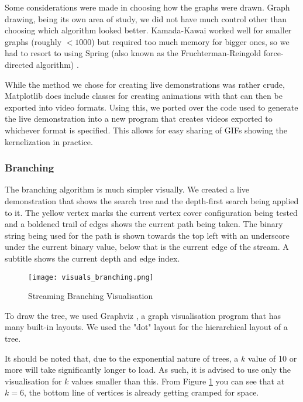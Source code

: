 Some considerations were made in choosing how the graphs were drawn. Graph
drawing, being its own area of study, we did not have much control other than
choosing which algorithm looked better. Kamada-Kawai \cite{kamada1989drawing}
worked well for smaller graphs (roughly $< 1000$) but required too much memory
for bigger ones, so we had to resort to using Spring (also known as the
Fruchterman-Reingold force-directed algorithm) \cite{fruchterman1991graph}.

While the method we chose for creating live demonstrations was rather crude,
Matplotlib does include classes for creating animations with that can then be
exported into video formats. Using this, we ported over the code used to
generate the live demonstration into a new program that creates videos exported
to whichever format is specified. This allows for easy sharing of GIFs showing
the kernelization in practice.

\subsubsection{Branching}

The branching algorithm is much simpler visually. We created a live
demonstration that shows the search tree and the depth-first search being
applied to it. The yellow vertex marks the current vertex cover configuration
being tested and a boldened trail of edges shows the current path being taken.
The binary string being used for the path is shown towards the top left with an
underscore under the current binary value, below that is the current edge of
the stream. A subtitle shows the current depth and edge index.

\begin{figure}[htb]
    \centering
    \texttt{[image: visuals\_branching.png]}
    \caption{Streaming Branching Visualisation}
    \label{fig:branching_visualisation}
\end{figure}

To draw the tree, we used Graphviz \cite{ellson2003graphviz}, a graph
visualisation program that has many built-in layouts. We used the "dot" layout
for the hierarchical layout of a tree.

It should be noted that, due to the exponential nature of trees, a \(k\) value
of 10 or more will take significantly longer to load. As such, it is advised to
use only the visualisation for \(k\) values smaller than this. From Figure
\ref{fig:branching_visualisation} you can see that at \(k=6\), the bottom line
of vertices is already getting cramped for space.

